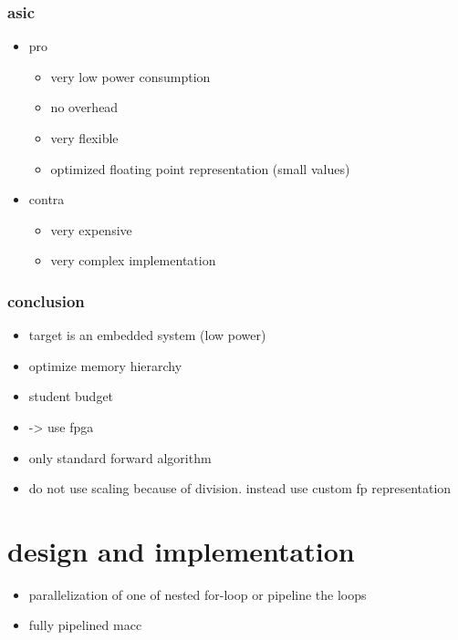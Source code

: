 \documentclass[mscthesis]{usiinfthesis}
\begin{document}
\subsection{asic}
\begin{itemize}
    \item pro
    \begin{itemize}
        \item very low power consumption
        \item no overhead
        \item very flexible
        \item optimized floating point representation (small values)
    \end{itemize}
    \item contra
    \begin{itemize}
        \item very expensive
        \item very complex implementation
    \end{itemize}
\end{itemize}

\subsection{conclusion}
\begin{itemize}
    \item target is an embedded system (low power)
    \item optimize memory hierarchy
    \item student budget
    \item -> use fpga
    \item only standard forward algorithm
    \item do not use scaling because of division. instead use custom fp
        representation
\end{itemize}


\chapter{design and implementation}
\label{ch:design}

\begin{itemize}
    \item parallelization of one of nested for-loop or pipeline the loops
    \item fully pipelined macc
\end{itemize}
\end{document}
